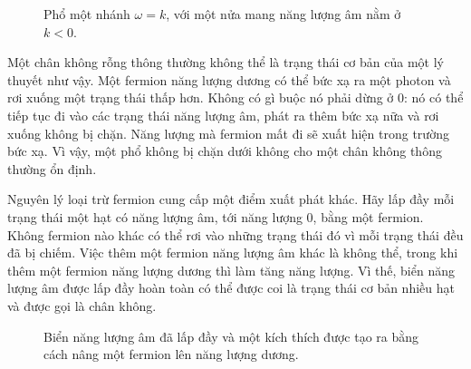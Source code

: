 \begin{figure}
\centering
{}
\caption{Phổ một nhánh \(\omega=k\), với một nửa mang năng lượng âm nằm ở \(k<0\).}
\end{figure}

Một chân không rỗng thông thường không thể là trạng thái cơ bản của một lý thuyết như vậy. Một fermion năng lượng dương có thể bức xạ ra một photon và rơi xuống một trạng thái thấp hơn. Không có gì buộc nó phải dừng ở 0: nó có thể tiếp tục đi vào các trạng thái năng lượng âm, phát ra thêm bức xạ nữa và rơi xuống không bị chặn. Năng lượng mà fermion mất đi sẽ xuất hiện trong trường bức xạ. Vì vậy, một phổ không bị chặn dưới không cho một chân không thông thường ổn định.

Nguyên lý loại trừ fermion cung cấp một điểm xuất phát khác. Hãy lấp đầy mỗi trạng thái một hạt có năng lượng âm, tới năng lượng 0, bằng một fermion. Không fermion nào khác có thể rơi vào những trạng thái đó vì mỗi trạng thái đều đã bị chiếm. Việc thêm một fermion năng lượng âm khác là không thể, trong khi thêm một fermion năng lượng dương thì làm tăng năng lượng. Vì thế, biển năng lượng âm được lấp đầy hoàn toàn có thể được coi là trạng thái cơ bản nhiều hạt và được gọi là chân không.

\begin{figure}
\centering
{}
\caption{Biển năng lượng âm đã lấp đầy và một kích thích được tạo ra bằng cách nâng một fermion lên năng lượng dương.}
\end{figure}


